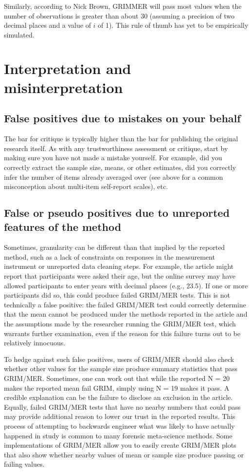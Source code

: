 \documentclass[letterpaper, 12pt]{article}
\begin{document}
{Similarly, according to Nick Brown, GRIMMER will pass most values when the number of observations is greater than about 30 (assuming a precision of two decimal places and a value of $i$ of 1). This rule of thumb has yet to be empirically simulated. 

\section*{Interpretation and misinterpretation}

\subsection*{False positives due to mistakes on your behalf}

The bar for critique is typically higher than the bar for publishing the original research itself. As with any trustworthiness assessment or critique, start by making sure you have not made a mistake yourself. For example, did you correctly extract the sample size, means, or other estimates, did you correctly infer the number of items already averaged over (see above for a common misconception about multi-item self-report scales), etc. 

\subsection*{False or pseudo positives due to unreported features of the method}

Sometimes, granularity can be different than that implied by the reported method, such as a lack of constraints on responses in the measurement instrument or unreported data cleaning steps. For example, the article might report that participants were asked their age, but the online survey may have allowed participants to enter years with decimal places (e.g., 23.5). If one or more participants did so, this could produce failed GRIM/MER tests. This is not technically a false positive: the failed GRIM/MER test could correctly determine that the mean cannot be produced under the methods reported in the article and the assumptions made by the researcher running the GRIM/MER test, which warrants further examination, even if the reason for this failure turns out to be relatively innocuous.

To hedge against such false positives, users of GRIM/MER should also check whether other values for the sample size produce summary statistics that pass GRIM/MER. Sometimes, one can work out that while the reported N = 20 makes the reported mean fail GRIM, simply using N = 19 makes it pass. A credible explanation can be the failure to disclose an exclusion in the article. Equally, failed GRIM/MER tests that have no nearby numbers that could pass may provide additional reason to lower our trust in the reported results. This process of attempting to backwards engineer what was likely to have actually happened in study is common to many forensic meta-science methods. Some implementations of GRIM/MER allow you to easily create GRIM/MER plots that also show whether nearby values of mean or sample size produce passing or failing values. 

}
\end{document}
